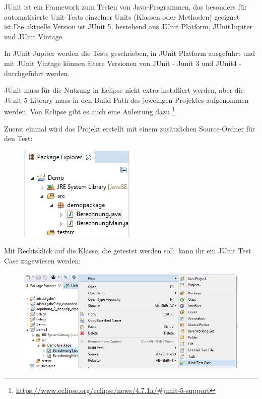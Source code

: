 
JUnit ist ein Framework zum Testen von Java-Programmen, das besonders für automatisierte Unit-Tests einzelner Units (Klassen oder Methoden) geeignet ist.Die aktuelle Version ist JUnit 5, bestehend aus JUnit Platform, JUnitJupiter und JUnit Vintage.

In JUnit Jupiter werden die Tests geschrieben, in JUnit Platform ausgeführt und mit JUnit Vintage können ältere Versionen von JUnit - Junit 3 und JUnit4 - durchgeführt werden.

JUnit muss für die Nutzung in Eclipse nicht extra installiert werden, aber die JUnit 5 Library muss in den Build Path des jeweiligen Projektes aufgenommen werden. Von Eclipse gibt es auch eine Anleitung dazu 
\footnote{\url{https://www.eclipse.org/eclipse/news/4.7.1a/\#junit-5-support}}

Zuerst einmal wird das Projekt erstellt mit einem zusätzlichen Source-Ordner für den Test:
\begin{figure}[H]
\centering
\includegraphics{Bilder/TRJU_1.png}
\end{figure}
 
Mit Rechtsklick auf die Klasse, die getestet werden soll, kann ihr ein JUnit Test Case zugewiesen werden:
 \begin{figure}[H]
\centering
\includegraphics[width=\textwidth]{Bilder/TRJU_2.png}
\end{figure}

